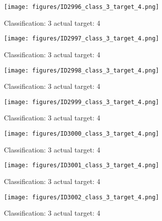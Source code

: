 \begin{figure}[h!]
\begin{center}
\texttt{[image: figures/ID2996\_class\_3\_target\_4.png]}
\end{center}
\caption{ Classification: 3 actual target: 4}
\label{fig:ID2996_class_3_target_4}
\end{figure}
\begin{figure}[h!]
\begin{center}
\texttt{[image: figures/ID2997\_class\_3\_target\_4.png]}
\end{center}
\caption{ Classification: 3 actual target: 4}
\label{fig:ID2997_class_3_target_4}
\end{figure}
\begin{figure}[h!]
\begin{center}
\texttt{[image: figures/ID2998\_class\_3\_target\_4.png]}
\end{center}
\caption{ Classification: 3 actual target: 4}
\label{fig:ID2998_class_3_target_4}
\end{figure}
\begin{figure}[h!]
\begin{center}
\texttt{[image: figures/ID2999\_class\_3\_target\_4.png]}
\end{center}
\caption{ Classification: 3 actual target: 4}
\label{fig:ID2999_class_3_target_4}
\end{figure}
\begin{figure}[h!]
\begin{center}
\texttt{[image: figures/ID3000\_class\_3\_target\_4.png]}
\end{center}
\caption{ Classification: 3 actual target: 4}
\label{fig:ID3000_class_3_target_4}
\end{figure}
\begin{figure}[h!]
\begin{center}
\texttt{[image: figures/ID3001\_class\_3\_target\_4.png]}
\end{center}
\caption{ Classification: 3 actual target: 4}
\label{fig:ID3001_class_3_target_4}
\end{figure}
\begin{figure}[h!]
\begin{center}
\texttt{[image: figures/ID3002\_class\_3\_target\_4.png]}
\end{center}
\caption{ Classification: 3 actual target: 4}
\label{fig:ID3002_class_3_target_4}
\end{figure}

